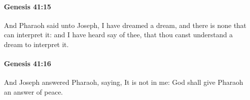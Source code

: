 		\paragraph{Genesis 41:15} %
			\label{GENESIS-41-15}

			And Pharaoh said unto Joseph, I have dreamed a dream, and there is none that can interpret it: and I have heard say of thee, that thou canst understand a dream to interpret it.


		\paragraph{Genesis 41:16} %
			\label{GENESIS-41-16}

			And Joseph answered Pharaoh, saying, It is not in me: God shall give Pharaoh an answer of peace.


